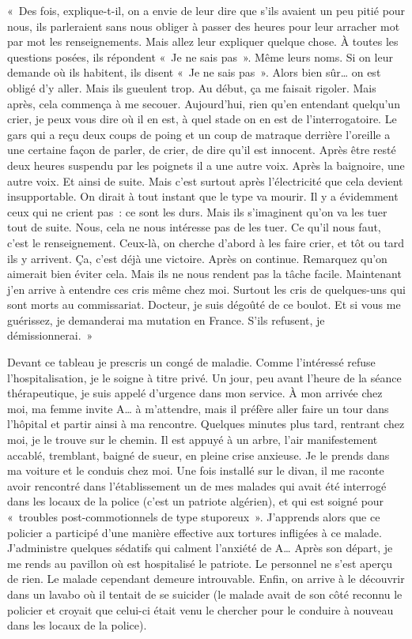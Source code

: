 \documentclass[french,twoside]{book} %
\begin{document}
\noindent « Des fois, explique-t-il, on a envie de leur dire que s’ils avaient un peu pitié pour nous, ils parleraient sans nous obliger à passer des heures pour leur arracher mot par mot les renseignements. Mais allez leur expliquer quelque chose. À toutes les questions posées, ils répondent « Je ne sais pas ». Même leurs noms. Si on leur demande où ils habitent, ils disent « Je ne sais pas ». Alors bien sûr… on est obligé d’y aller. Mais ils gueulent trop. Au début, ça me faisait rigoler. Mais après, cela commença à me secouer. Aujourd’hui, rien qu’en entendant quelqu’un crier, je peux vous dire où il en est, à quel stade on en est de l’interrogatoire. Le gars qui a reçu deux coups de poing et un coup de matraque derrière l’oreille a une certaine façon de parler, de crier, de dire qu’il est innocent. Après être resté deux heures suspendu par les poignets il a une autre voix. Après la baignoire, une autre voix. Et ainsi de suite. Mais c’est surtout après l’électricité que cela devient insupportable. On dirait à tout instant que le type va mourir. Il y a évidemment ceux qui ne crient pas : ce sont les durs. Mais ils s’imaginent qu’on va les tuer tout de suite. Nous, cela ne nous intéresse pas de les tuer. Ce qu’il nous faut, c’est le renseignement. Ceux-là, on cherche d’abord à les faire crier, et tôt ou tard ils y arrivent. Ça, c’est déjà une victoire. Après on continue. Remarquez qu’on aimerait bien éviter cela. Mais ils ne nous rendent pas la tâche facile. Maintenant j’en arrive à entendre ces cris même chez moi. Surtout les cris de quelques-uns qui sont morts au commissariat. Docteur, je suis dégoûté de ce boulot. Et si vous me guérissez, je demanderai ma mutation en France. S’ils refusent, je démissionnerai. »\par
\bigbreak
\noindent Devant ce tableau je prescris un congé de maladie. Comme l’intéressé refuse l’hospitalisation, je le soigne à titre privé. Un jour, peu avant l’heure de la séance thérapeutique, je suis appelé   d’urgence dans mon service. À mon arrivée chez moi, ma femme invite A… à m’attendre, mais il préfère aller faire un tour dans l’hôpital et partir ainsi à ma rencontre. Quelques minutes plus tard, rentrant chez moi, je le trouve sur le chemin. Il est appuyé à un arbre, l’air manifestement accablé, tremblant, baigné de sueur, en pleine crise anxieuse. Je le prends dans ma voiture et le conduis chez moi. Une fois installé sur le divan, il me raconte avoir rencontré dans l’établissement un de mes malades qui avait été interrogé dans les locaux de la police (c’est un patriote algérien), et qui est soigné pour « troubles post-commotionnels de type stuporeux ». J’apprends alors que ce policier a participé d’une manière effective aux tortures infligées à ce malade. J’administre quelques sédatifs qui calment l’anxiété de A… Après son départ, je me rends au pavillon où est hospitalisé le patriote. Le personnel ne s’est aperçu de rien. Le malade cependant demeure introuvable. Enfin, on arrive à le découvrir dans un lavabo où il tentait de se suicider (le malade avait de son côté reconnu le policier et croyait que celui-ci était venu le chercher pour le conduire à nouveau dans les locaux de la police).\par
\end{document}
